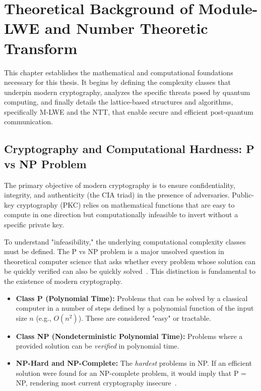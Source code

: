 \chapter{Theoretical Background of Module-LWE and Number Theoretic Transform}
\label{ch:theoretical_background}

This chapter establishes the mathematical and computational foundations necessary for this thesis. It begins by defining the complexity classes that underpin modern cryptography, analyzes the specific threats posed by quantum computing, and finally details the lattice-based structures and algorithms, specifically M-LWE and the NTT, that enable secure and efficient post-quantum communication.

\section{Cryptography and Computational Hardness: P vs NP Problem}
\label{sec:cryptography_fundamentals}

The primary objective of modern cryptography is to ensure confidentiality, integrity, and authenticity (the CIA triad) in the presence of adversaries.
Public-key cryptography (PKC) relies on mathematical functions that are easy to compute in one direction but computationally infeasible to invert without a specific private key.

To understand "infeasibility," the underlying computational complexity classes must be defined.
The P vs NP problem is a major unsolved question in theoretical computer science that asks whether every problem whose solution can be quickly verified can also be quickly solved~\cite{millennium_p_vs_np}.
This distinction is fundamental to the existence of modern cryptography.

\begin{itemize}
    \item \textbf{Class P (Polynomial Time):} Problems that can be solved by a classical computer in a number of steps defined by a polynomial function of the input size $n$ (e.g., $O(n^2)$). These are considered "easy" or tractable.
    \item \textbf{Class NP (Nondeterministic Polynomial Time):} Problems where a provided solution can be \textit{verified} in polynomial time.
    \item \textbf{NP-Hard and NP-Complete:} The \textit{hardest} problems in NP. If an efficient solution were found for an NP-complete problem, it would imply that P = NP, rendering most current cryptography insecure~\cite{wiki_p_vs_np}.
\end{itemize}

